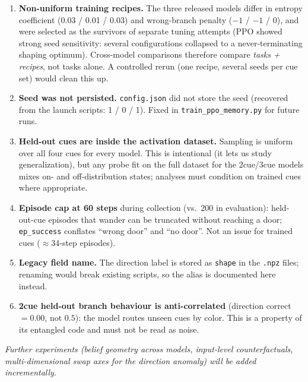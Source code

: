 \documentclass[11pt]{article}
\begin{document}
\begin{enumerate}
  \item \textbf{Non-uniform training recipes.} The three released models differ in entropy
        coefficient (0.03 / 0.01 / 0.03) and wrong-branch penalty ($-1$ / $-1$ / $0$), and were
        selected as the survivors of separate tuning attempts (PPO showed strong seed sensitivity:
        several configurations collapsed to a never-terminating shaping optimum). Cross-model
        comparisons therefore compare \emph{tasks + recipes}, not tasks alone. A controlled rerun
        (one recipe, several seeds per cue set) would clean this up.
  \item \textbf{Seed was not persisted.} \texttt{config.json} did not store the seed (recovered
        from the launch scripts: 1 / 0 / 1). Fixed in \texttt{train\_ppo\_memory.py} for future
        runs.
  \item \textbf{Held-out cues are inside the activation dataset.} Sampling is uniform over all
        four cues for every model. This is intentional (it lets us study generalization), but any
        probe fit on the full dataset for the 2cue/3cue models mixes on- and off-distribution
        states; analyses must condition on trained cues where appropriate.
  \item \textbf{Episode cap at 60 steps} during collection (vs.\ 200 in evaluation): held-out-cue
        episodes that wander can be truncated without reaching a door; \texttt{ep\_success}
        conflates ``wrong door'' and ``no door''. Not an issue for trained cues
        ($\approx$34-step episodes).
  \item \textbf{Legacy field name.} The direction label is stored as \texttt{shape} in the
        \texttt{.npz} files; renaming would break existing scripts, so the alias is documented
        here instead.
  \item \textbf{2cue held-out branch behaviour is anti-correlated} (direction correct $= 0.00$,
        not $0.5$): the model routes unseen cues by color. This is a property of its entangled
        code and must not be read as noise.
\end{enumerate}

\vspace{2mm}
\noindent\textit{Further experiments (belief geometry across models, input-level counterfactuals,
multi-dimensional swap axes for the direction anomaly) will be added incrementally.}
\end{document}
